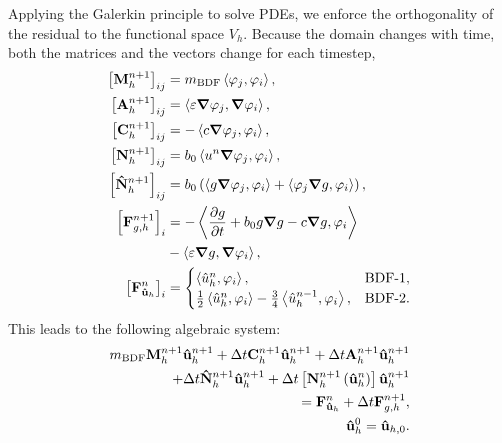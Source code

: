 \documentclass[../../thesis.tex]{subfiles}
\newcommand{\inner}[2]{\left<#1, #2\right>}
\newcommand{\dt}{\ensuremath{\Delta t}}
\begin{document}
Applying the Galerkin principle to solve PDEs, we enforce the orthogonality of the residual to the functional space $V_h$. 
Because the domain changes with time, 
both the matrices and the vectors change for each timestep,
\begin{subequations}
    \label{eq:1d_fom_linear_system_operators}
    \begin{align}
        \left[\vb{M}_{h}^{n+1}\right]_{ij}           &= m_{\text{BDF}} \inner{\varphi_j}{\varphi_i}, 
        \\
        \left[\vb{A}_{h}^{n+1}\right]_{ij}           &= \inner{\varepsilon \grad \varphi_j}{\grad \varphi_i}, 
        \\
        \left[\vb{C}_{h}^{n+1}\right]_{ij}           &= -\inner{c \grad \varphi_j}{\varphi_i}, 
        \\
        \left[\vb{N}_{h}^{n+1}\right]_{ij}           &= b_0 \inner{u^{n} \grad \varphi_j}{\varphi_i}, 
        \\
        \left[\vb{\hat{N}}_{h}^{n+1}\right]_{ij}     &= b_0 \left(\inner{g \grad \varphi_j}{\varphi_i} + \inner{\varphi_j \grad g}{\varphi_i}\right), 
        \\
        \left[\vb{F}_{{g,h}}^{n+1}\right]_{i}        &= -\inner{\pdv{g}{t} + b_0 g \grad g - c \grad g}{\varphi_i} \nonumber
        \\
                                                     &  -\inner{\varepsilon \grad g}{\grad \varphi_i},
        \label{eq:1d_fom_linear_system_operators_fg}
        \\ 
        \left[\vb{F}_{\vb{\hat{u}}_h}^{n}\right]_{i} &= 
            \begin{cases}
                \inner{\hat{u}_h^{n}}{\varphi_i}, &\text{BDF-1},
                \\
                \frac{1}{2}\inner{\hat{u}_h^{n}}{\varphi_i}
                - \frac{3}{4}\inner{\hat{u}_h^{n-1}}{\varphi_i}, &\text{BDF-2}.
            \end{cases}
    \end{align}
\end{subequations}
This leads to the following algebraic system:
\begin{subequations}
    \begin{align}
        \label{eq:1d_fom_weak_formulation_discrete}
        m_{\text{BDF}} \vb{M}^{n+1}_h \vb{\hat{u}}_{h}^{n+1} 
        + \dt \vb{C}^{n+1}_h \vb{\hat{u}}_{h}^{n+1} 
        + \dt \vb{A}^{n+1}_h \vb{\hat{u}}_{h}^{n+1} 
        \nonumber 
        \\ 
        + \dt \vb{\hat{N}}^{n+1}_h \vb{\hat{u}}_{h}^{n+1} 
        + \dt \left[\vb{N}^{n+1}_h\left(\vb{\hat{u}}_{h}^{n}\right)\right] \vb{\hat{u}}_{h}^{n+1} 
        \nonumber
        \\ 
        = \vb{F}_{\vb{\hat{u}}_h}^{n}
        + \dt \vb{F}_{g,h}^{n+1}, \\
        \vb{\hat{u}}_h^{0} = \vb{\hat{u}}_{h,0}.
    \end{align}
\end{subequations}
\end{document}
